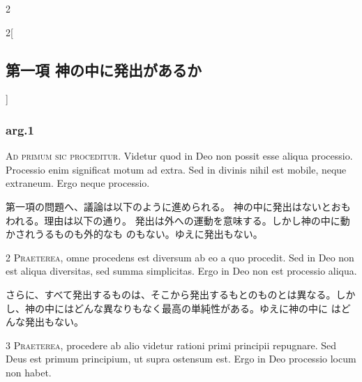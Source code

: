 \documentclass[paper=a4paper,fontsize=10pt,jafontsize=9pt,titlepage]{jlreq}
\begin{document}
\begin{paracol}{2}
\switchcolumn*



\end{paracol}

\newpage


{}
\setcounter{section}{27}
\setcounter{subsection}{0}


\begin{paracol}{2}[\subsection{第一項 神の中に発出があるか}]

\subsubsection{arg.1}

{\Huge A}{\scshape d primum sic proceditur}. Videtur quod in Deo non possit esse aliqua
processio. Processio enim significat motum ad extra. Sed in divinis
nihil est mobile, neque extraneum. Ergo neque processio.


\switchcolumn


第一項の問題へ、議論は以下のように進められる。
神の中に発出はないとおもわれる。理由は以下の通り。
発出は外への運動を意味する。しかし神の中に動かされうるものも外的なも
 のもない。ゆえに発出もない。




2 {\scshape Praeterea}, omne procedens est diversum ab eo a quo procedit. Sed in Deo
non est aliqua diversitas, sed summa simplicitas. Ergo in Deo non est
processio aliqua.


\switchcolumn


さらに、すべて発出するものは、そこから発出するもとのものとは異なる。しか
 し、神の中にはどんな異なりもなく最高の単純性がある。ゆえに神の中に
 はどんな発出もない。




3 {\scshape Praeterea}, procedere ab alio videtur rationi primi principii
repugnare. Sed Deus est primum principium, ut supra ostensum est. Ergo
in Deo processio locum non habet.



\end{paracol}
\end{document}
